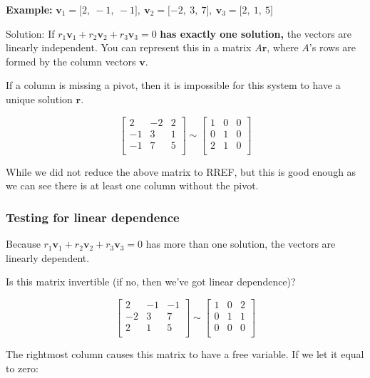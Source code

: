 \documentclass[12pt]{article}
\theoremstyle{plain}
\theoremstyle{remark}
\theoremstyle{definition}
\begin{document}
\textbf{Example:}
\({\mathbf{v}}_{1} = \lbrack 2,\  - 1,\  - 1\rbrack,\ {\mathbf{v}}_{2} = \lbrack - 2,\ 3,\ 7\rbrack,\ {\mathbf{v}}_{3} = \lbrack 2,\ 1,\ 5\rbrack\)

Solution: If
\(r_{1}{\mathbf{v}}_{1} + r_{2}{\mathbf{v}}_{2} + r_{3}{\mathbf{v}}_{3} = 0\)
\textbf{has exactly one solution,} the vectors are linearly independent.
You can represent this in a matrix \(A\mathbf{r}\), where \(A\)'s
rows are formed by the column vectors \(\mathbf{v}\).

If a column is missing a pivot, then it is impossible for this system to
have a unique solution \(\mathbf{r}\).

\[\begin{bmatrix}
2 & - 2 & 2 \\
 - 1 & 3 & 1 \\
 - 1 & 7 & 5 \\
\end{bmatrix}\sim\begin{bmatrix}
1 & 0 & 0 \\
0 & 1 & 0 \\
2 & 1 & 0 \\
\end{bmatrix}\]

While we did not reduce the above matrix to RREF, but this is good
enough as we can see there is at least one column without the pivot.


\subsubsection{Testing for linear
dependence}

Because
\(r_{1}{\mathbf{v}}_{1} + r_{2}{\mathbf{v}}_{2} + r_{3}{\mathbf{v}}_{3} = 0\)
has more than one solution, the vectors are linearly dependent.

Is this matrix invertible (if no, then we've got linear dependence)?

\[\begin{bmatrix}
2 & - 1 & - 1 \\
 - 2 & 3 & 7 \\
2 & 1 & 5 \\
\end{bmatrix}\sim\begin{bmatrix}
1 & 0 & 2 \\
0 & 1 & 1 \\
0 & 0 & 0 \\
\end{bmatrix}\]

The rightmost column causes this matrix to have a free variable. If we
let it equal to zero:
\end{document}
